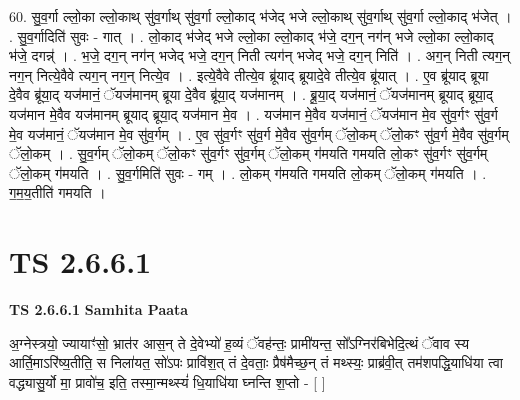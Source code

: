 \documentclass[17pt]{extarticle}
\begin{document}
60. सु॒व॒र्गा ल्लो॒का ल्लो॒काथ् सु॑व॒र्गाथ् सु॑व॒र्गा ल्लो॒काद् भ॑जेद् भजे ल्लो॒काथ् सु॑व॒र्गाथ् सु॑व॒र्गा ल्लो॒काद् भ॑जेत् । . सु॒व॒र्गादिति॑ सुवः - गात् । . लो॒काद् भ॑जेद् भजे ल्लो॒का ल्लो॒काद् भ॑जे॒ दग॒न् नग॑न् भजे ल्लो॒का ल्लो॒काद् भ॑जे॒ दगन्न्॑ । . भ॒जे॒ दग॒न् नग॑न् भजेद् भजे॒ दग॒न् निती त्यग॑न् भजेद् भजे॒ दग॒न् निति॑ । . अग॒न् निती त्यग॒न् नग॒न् नित्ये॒वैवे त्यग॒न् नग॒न् नित्ये॒व । . इत्ये॒वैवे तीत्ये॒व ब्रू॑याद् ब्रूयादे॒वे तीत्ये॒व ब्रू॑यात् । . ए॒व ब्रू॑याद् ब्रूया दे॒वैव ब्रू॑या॒द् यज॑मानं॒ ॅयज॑मानम् ब्रूया दे॒वैव ब्रू॑या॒द् यज॑मानम् । . ब्रू॒या॒द् यज॑मानं॒ ॅयज॑मानम् ब्रूयाद् ब्रूया॒द् यज॑मान मे॒वैव यज॑मानम् ब्रूयाद् ब्रूया॒द् यज॑मान मे॒व । . यज॑मान मे॒वैव यज॑मानं॒ ॅयज॑मान मे॒व सु॑व॒र्गꣳ सु॑व॒र्ग मे॒व यज॑मानं॒ ॅयज॑मान मे॒व सु॑व॒र्गम् । . ए॒व सु॑व॒र्गꣳ सु॑व॒र्ग मे॒वैव सु॑व॒र्गम् ॅलो॒कम् ॅलो॒कꣳ सु॑व॒र्ग मे॒वैव सु॑व॒र्गम् ॅलो॒कम् । . सु॒व॒र्गम् ॅलो॒कम् ॅलो॒कꣳ सु॑व॒र्गꣳ सु॑व॒र्गम् ॅलो॒कम् ग॑मयति गमयति लो॒कꣳ सु॑व॒र्गꣳ सु॑व॒र्गम् ॅलो॒कम् ग॑मयति । . सु॒व॒र्गमिति॑ सुवः - गम् । . लो॒कम् ग॑मयति गमयति लो॒कम् ॅलो॒कम् ग॑मयति । . ग॒म॒य॒तीति॑ गमयति । \newline
\pagebreak
{}
\section*{ TS 2.6.6.1 }

\textbf{TS 2.6.6.1 } \newline
\textbf{Samhita Paata} \newline

अ॒ग्नेस्त्रयो॒ ज्यायाꣳ॑सो॒ भ्रात॑र आस॒न् ते दे॒वेभ्यो॑ ह॒व्यं ॅवह॑न्तः॒ प्रामी॑यन्त॒ सो᳚ऽग्निर॑बिभेदि॒त्थं ॅवाव स्य आर्ति॒माऽरि॑ष्य॒तीति॒ स निला॑यत॒ सो॑ऽपः प्रावि॑श॒त् तं दे॒वताः॒ प्रैष॑मैच्छ॒न् तं मथ्स्यः॒ प्राब्र॑वी॒त् तम॑शपद्धि॒याधि॑या त्वा वद्ध्यासु॒र्यो मा॒ प्रावो॑च॒ इति॒ तस्मा॒न्मथ्स्यं॑ धि॒याधि॑या घ्नन्ति श॒प्तो - [  ] \newline
\end{document}
